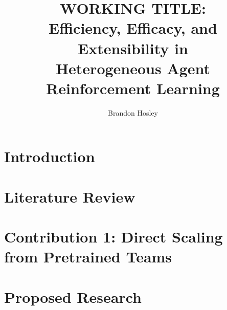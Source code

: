 \documentclass{afitthesis}
\title{ WORKING TITLE:\\
    Efficiency, Efficacy, and Extensibility in\\
    Heterogeneous Agent Reinforcement Learning }
\author{Brandon Hosley}
\begin{document}
\maketitle %


\chapter{Introduction}%


\chapter{Literature Review}%
\label{ch:literature_review}


\chapter{Contribution 1: Direct Scaling from Pretrained Teams}
\label{ch:contribution_1}


\label{ch:contribution_2}
% 

\label{ch:contribution_3}
% 

\chapter{Proposed Research}%
\label{ch:methodology}


%
\end{document}
